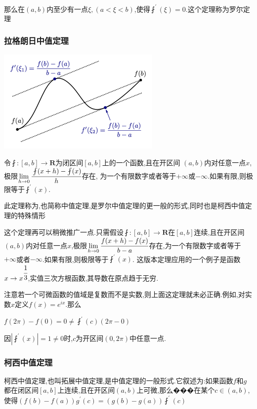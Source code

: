 \documentclass[UTF8,12pt]{ctexbook}
\newcommand{\limNormal}[1]{\lim\limits_{#1}}
\newcommand{\derivative}{^\prime}
\newcommand{\fDerivative}[1]{\fint\derivative(#1)}
\newcommand{\defFunction}[1]{f(#1)}
\begin{document}
{{{{  那么在$(a,b)$内至少有一点$\xi, (a<\xi<b)$,使得$\fint\derivative(\xi) = 0$.这个定理称为罗尔定理
}%

\subsubsection{拉格朗日中值定理}{
\begin{center}
  \includegraphics{resources/Lagrange's_mean_value_theorem.png}
\end{center}

令$\fint : [a,b] \to \mathbf{R}$为闭区间$[a,b]$上的一个函数,且在开区间
$(a,b)$内对任意一点$x$,极限$\limNormal{h \to 0}\cfrac{\fint(x + h) - \fint(x)}{h}$存在,
为一个有限数字或者等于$+\infty$或$-\infty$.如果有限,则极限等于$\fDerivative{x}$.

此定理称为{},也简称中值定理,是罗尔中值定理的更一般的形式,同时也是柯西中值定理的特殊情形

这个定理再可以稍微推广一点.只需假设$\fint : [a,b] \to \mathbf{R}$在$[a,b]$连续,且在开区间$(a,b)$内对任意一点$x$,极限$\limNormal{h \to 0}
  \cfrac{\defFunction{x + h} - \defFunction{x}}{b - a}$存在,为一个有限数字或者等于$+\infty$或者$-\infty$.如果有限,则极限等于$\fDerivative{x}$.
这版本定理应用的一个例子是函数$x \to x^{\cfrac{1}{3}}$,实值三次方根函数,其导数在原点趋于无穷.

注意若一个可微函数的值域是复数而不是实数,则上面这定理就未必正确.例如,对实数$x$定义$\defFunction{x} = e^{ix}$.那么

$\defFunction{2\pi} - \defFunction{0} = 0 \neq \fDerivative{c}(2\pi - 0)$

因$|\fDerivative{x}| = 1 \neq 0$时,$c$为开区间$(0,2\pi)$中任意一点.
}%

\subsubsection{柯西中值定理}{
  柯西中值定理,也叫拓展中值定理,是中值定理的一般形式.它叙述为:如果函数$f$和$g$都在闭区间$[a,b]$上连续,且在开区间$(a,b)$上可微,那么���在某个$c \in (a,b)$,
  使得$(\defFunction{b} - \defFunction{a})g\derivative(c) = (g(b)-g(a))\fDerivative{c}$

}}}}
\end{document}
